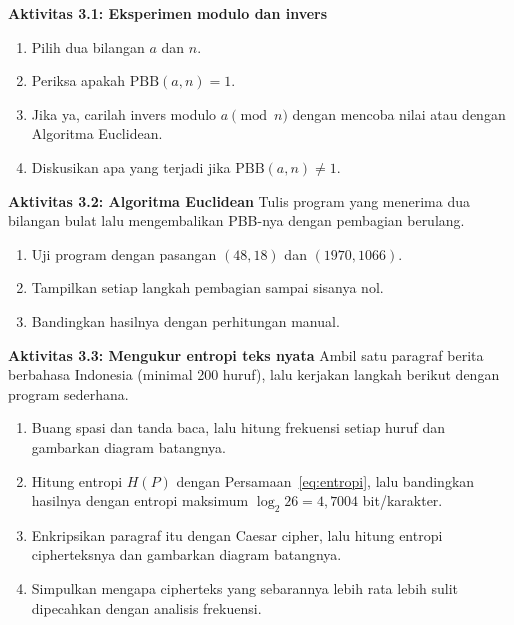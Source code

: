 \begin{obeactivity}
\textbf{Aktivitas 3.1: Eksperimen modulo dan invers}
\begin{enumerate}
    \item Pilih dua bilangan $a$ dan $n$.
    \item Periksa apakah $\text{PBB}(a,n) = 1$.
    \item Jika ya, carilah invers modulo $a \pmod n$ dengan mencoba nilai atau
          dengan Algoritma Euclidean.
    \item Diskusikan apa yang terjadi jika $\text{PBB}(a,n) \neq 1$.
\end{enumerate}
\end{obeactivity}

\begin{obeactivity}
\textbf{Aktivitas 3.2: Algoritma Euclidean}
Tulis program yang menerima dua bilangan bulat lalu mengembalikan PBB-nya dengan
pembagian berulang.
\begin{enumerate}
    \item Uji program dengan pasangan $(48,18)$ dan $(1970,1066)$.
    \item Tampilkan setiap langkah pembagian sampai sisanya nol.
    \item Bandingkan hasilnya dengan perhitungan manual.
\end{enumerate}
\end{obeactivity}

\begin{obeactivity}
\textbf{Aktivitas 3.3: Mengukur entropi teks nyata}
Ambil satu paragraf berita berbahasa Indonesia (minimal 200 huruf), lalu kerjakan
langkah berikut dengan program sederhana.
\begin{enumerate}
    \item Buang spasi dan tanda baca, lalu hitung frekuensi setiap huruf dan
          gambarkan diagram batangnya.
    \item Hitung entropi $H(P)$ dengan Persamaan~\ref{eq:entropi}, lalu bandingkan
          hasilnya dengan entropi maksimum $\log_2 26 = 4{,}7004$ bit/karakter.
    \item Enkripsikan paragraf itu dengan Caesar cipher, lalu hitung entropi
          cipherteksnya dan gambarkan diagram batangnya.
    \item Simpulkan mengapa cipherteks yang sebarannya lebih rata lebih sulit
          dipecahkan dengan analisis frekuensi.
\end{enumerate}
\end{obeactivity}
